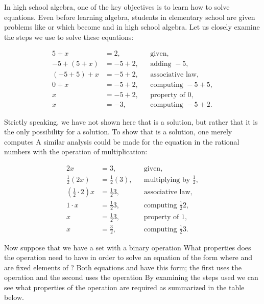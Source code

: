 \documentclass[11pt,oneside]{article}
\begin{document}
\fi
\renewcommand{\BookFooter}{Section 2 Groups}
\ifdefined\BookMaster\else\setcounter{page}{19}\fi
\BookNarrativetrue

\begin{BookBody}


\noindent In high school algebra, one of the key objectives is to learn how to solve equations. Even before learning algebra, students in elementary school are given problems like  or  which become  and  in high school algebra. Let us closely examine the steps we use to solve these equations:

\[
\begin{aligned}
5+x &= 2, &&\text{given,}\\
-5+(5+x) &= -5+2, &&\text{adding }-5,\\
(-5+5)+x &= -5+2, &&\text{associative law,}\\
0+x &= -5+2, &&\text{computing }-5+5,\\
x &= -5+2, &&\text{property of }0,\\
x &= -3, &&\text{computing }-5+2.
\end{aligned}
\]

\noindent Strictly speaking, we have not shown here that  is a solution, but rather that it is the only possibility for a solution. To show that  is a solution, one merely computes  A similar analysis could be made for the equation  in the rational numbers with the operation of multiplication:

\[
\begin{aligned}
2x &= 3, &&\text{given,}\\
\frac{1}{2}(2x) &= \frac{1}{2}(3), &&\text{multiplying by }\frac{1}{2},\\
\left(\frac{1}{2}\cdot2\right)x &= \frac{1}{2}3, &&\text{associative law,}\\
1\cdot x &= \frac{1}{2}3, &&\text{computing }\frac{1}{2}2,\\
x &= \frac{1}{2}3, &&\text{property of }1,\\
x &= \frac{3}{2}, &&\text{computing }\frac{1}{2}3.
\end{aligned}
\]

Now suppose that we have a set with a binary operation  What properties does the operation need to have in order to solve an equation of the form  where  and  are fixed elements of ? Both equations  and  have this form; the 
first uses the operation \BookInline{+,\allowbreak } and the second uses the operation  By examining the steps used we can see what properties of the operation \BookInline{\ast } are required as summarized in the table below.

\end{BookBody}
\end{document}
